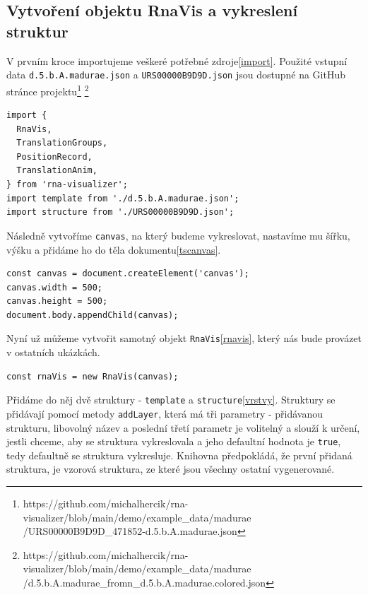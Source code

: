 \subsection{Vytvoření objektu RnaVis a vykreslení struktur}

V prvním kroce importujeme veškeré potřebné zdroje\ref{import}. Použité vstupní data
\texttt{d.5.b.A.madurae.json} a \texttt{URS00000B9D9D.json} jsou dostupné na
GitHub stránce
projektu\footnote{https://github.com/michalhercik/rna-visualizer/blob/main/demo/example\_data/madurae\\/URS00000B9D9D\_471852-d.5.b.A.madurae.json}
\footnote{https://github.com/michalhercik/rna-visualizer/blob/main/demo/example\_data/madurae\\/d.5.b.A.madurae\_fromn\_d.5.b.A.madurae.colored.json}

\begin{lstlisting}[caption={Import},label=import]
import { 
  RnaVis, 
  TranslationGroups, 
  PositionRecord,
  TranslationAnim,
} from 'rna-visualizer';
import template from './d.5.b.A.madurae.json';
import structure from './URS00000B9D9D.json';
\end{lstlisting}

Následně vytvoříme \texttt{canvas}, na který budeme vykreslovat, nastavíme mu
šířku, výšku a přidáme ho do těla dokumentu\ref{tscanvas}.

\begin{lstlisting}[caption={Vytvoření a nastavení canvas},label=tscanvas]
const canvas = document.createElement('canvas');
canvas.width = 500;
canvas.height = 500;
document.body.appendChild(canvas);
\end{lstlisting}

Nyní už můžeme vytvořit samotný objekt \texttt{RnaVis}\ref{rnavis}, který nás bude provázet
v ostatních ukázkách.

\begin{lstlisting}[caption={Vytvoření RnaVis}, label=rnavis]
const rnaVis = new RnaVis(canvas);
\end{lstlisting}

Přidáme do něj dvě struktury - \texttt{template} a \texttt{structure}\ref{vrstvy}.
Struktury se přidávají pomocí metody \texttt{addLayer}, která má tři parametry
- přidávanou strukturu, libovolný název a poslední třetí parametr je volitelný
a slouží k určení, jestli chceme, aby se struktura vykreslovala a jeho
defaultní hodnota je \texttt{true}, tedy defaultně se struktura vykresluje.
Knihovna předpokládá, že první přidaná struktura, je vzorová struktura, ze
které jsou všechny ostatní vygenerované.


